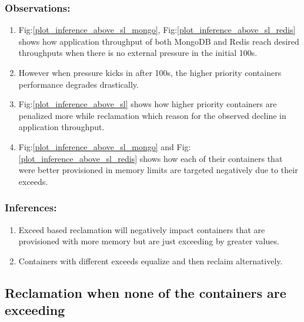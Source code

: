 	\subsubsection{Observations:}
	  \begin{enumerate}
	    \item Fig:\ref{plot_inference_above_sl_mongo}, Fig:\ref{plot_inference_above_sl_redis}  shows how application throughput of 
both MongoDB and Redis reach desired throughputs when there is no external pressure in the initial 100s.
	    \item However when pressure kicks in after 100s, the higher priority containers performance degrades drastically. 
	    \item Fig:\ref{plot_inference_above_sl} shows how higher priority containers are penalized more while reclamation which reason 
for the observed decline in application throughput.   
	    \item Fig:\ref{plot_inference_above_sl_mongo} and Fig:\ref{plot_inference_above_sl_redis} shows how each of their containers 
that were better provisioned in memory limits are targeted negatively due to their exceeds.
	  \end{enumerate}
	  
	\subsubsection{Inferences:}
	  \begin{enumerate}
	    \item Exceed based reclamation will negatively impact containers that are provisioned with more memory but are just exceeding 
by greater values.
	    \item Containers with different exceeds equalize and then reclaim alternatively.
	  \end{enumerate}

	  
    \subsection{Reclamation when none of the containers are exceeding}
	
